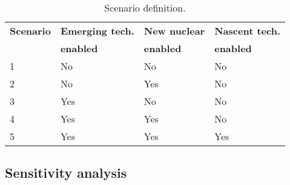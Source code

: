 
\begin{table}[!ht]
	\caption{Scenario definition.}
	\vspace{0.1in}
	\begin{tabularx}{\textwidth}{p{} p{} p{} p{}}
\hline 
\textbf{Scenario}& \textbf{Emerging tech.} & \textbf{New nuclear} & \textbf{Nascent tech.}\\
                 & \textbf{enabled} & \textbf{enabled} & \textbf{enabled}\\
                  \hline
1               &  No       &         No     &     No  \\ 
2               &   No       &      Yes     &     No  \\ 
3               &   Yes     &         No      &     No   \\
4               &   Yes     &      Yes     &     No  \\ 
5               &   Yes     &      Yes     &     Yes  \\ 
\hline
	\end{tabularx}
\label{scen-table}
\end{table}



\subsection{Sensitivity analysis}


